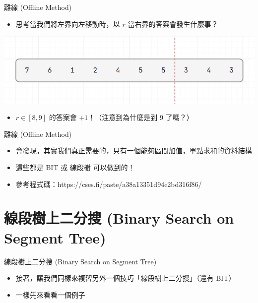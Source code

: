 \documentclass[aspectratio=169]{beamer}
\begin{document}
    \begin{frame}{離線 (Offline Method)}
        \begin{itemize}
            \item 思考當我們將左界向左移動時，以 $r$ 當右界的答案會發生什麼事？
        \end{itemize}
        \begin{center}
            \includegraphics[scale=0.4]{offline/array4.png}
        \end{center}
        \begin{itemize}
            \item $r \in [8,9]$ 的答案會 $+1$！（注意到為什麼是到 $9$ 了嗎？）
        \end{itemize}
    \end{frame}

    \begin{frame}{離線 (Offline Method)}
        \begin{itemize}
            \item 會發現，其實我們真正需要的，只有一個能夠區間加值，單點求和的資料結構
            \item<2-> 這些都是 BIT 或 線段樹 可以做到的！
            \item<3-> 參考程式碼：https://cses.fi/paste/a38a13351d94e2bd316f86/
        \end{itemize}
    \end{frame}

    \section{線段樹上二分搜 (Binary Search on Segment Tree)}

    \begin{frame}{線段樹上二分搜 (Binary Search on Segment Tree)}
        \begin{itemize}
            \item 接著，讓我們同樣來複習另外一個技巧「線段樹上二分搜」（還有 BIT）
            \item 一樣先來看看一個例子
        \end{itemize}
    \end{frame}
\end{document}
